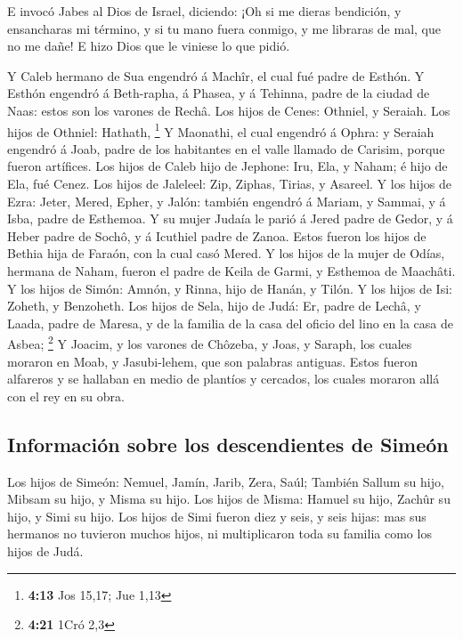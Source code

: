  E invocó Jabes al Dios de Israel, diciendo: ¡Oh si me
dieras bendición, y ensancharas mi término, y si tu mano fuera conmigo,
y me libraras de mal, que no me dañe! E hizo Dios que le viniese lo que
pidió.

 Y Caleb hermano de Sua engendró á Machîr, el cual fué
padre de Esthón.  Y Esthón engendró á Beth-rapha, á Phasea,
y á Tehinna, padre de la ciudad de Naas: estos son los varones de Rechâ.
 Los hijos de Cenes: Othniel, y Seraiah. Los hijos de
Othniel: Hathath, \footnote{\textbf{4:13} Jos 15,17; Jue 1,13}
 Y Maonathi, el cual engendró á Ophra: y Seraiah engendró á
Joab, padre de los habitantes en el valle llamado de Carisim, porque
fueron artífices.  Los hijos de Caleb hijo de Jephone: Iru,
Ela, y Naham; é hijo de Ela, fué Cenez.  Los hijos de
Jaleleel: Zip, Ziphas, Tirias, y Asareel.  Y los hijos de
Ezra: Jeter, Mered, Epher, y Jalón: también engendró á Mariam, y Sammai,
y á Isba, padre de Esthemoa.  Y su mujer Judaía le parió á
Jered padre de Gedor, y á Heber padre de Sochô, y á Icuthiel padre de
Zanoa. Estos fueron los hijos de Bethia hija de Faraón, con la cual casó
Mered.  Y los hijos de la mujer de Odías, hermana de Naham,
fueron el padre de Keila de Garmi, y Esthemoa de Maachâti. 
Y los hijos de Simón: Amnón, y Rinna, hijo de Hanán, y Tilón. Y los
hijos de Isi: Zoheth, y Benzoheth.  Los hijos de Sela, hijo
de Judá: Er, padre de Lechâ, y Laada, padre de Maresa, y de la familia
de la casa del oficio del lino en la casa de Asbea; \footnote{\textbf{4:21}
  1Cró 2,3}  Y Joacim, y los varones de Chôzeba, y Joas, y
Saraph, los cuales moraron en Moab, y Jasubi-lehem, que son palabras
antiguas.  Estos fueron alfareros y se hallaban en medio de
plantíos y cercados, los cuales moraron allá con el rey en su obra.

\hypertarget{informaciuxf3n-sobre-los-descendientes-de-simeuxf3n}{%
\subsection{Información sobre los descendientes de
Simeón}\label{informaciuxf3n-sobre-los-descendientes-de-simeuxf3n}}

 Los hijos de Simeón: Nemuel, Jamín, Jarib, Zera, Saúl;
 También Sallum su hijo, Mibsam su hijo, y Misma su hijo.
 Los hijos de Misma: Hamuel su hijo, Zachûr su hijo, y Simi
su hijo.  Los hijos de Simi fueron diez y seis, y seis
hijas: mas sus hermanos no tuvieron muchos hijos, ni multiplicaron toda
su familia como los hijos de Judá.

